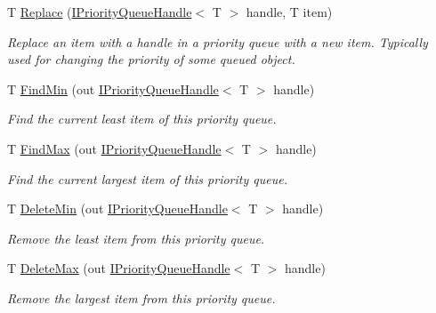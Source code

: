\begin{DoxyCompactItemize}
T \hyperlink{class_c5_1_1_interval_heap_abfc2e592410f83b10f7feb82bcbd53db}{Replace} (\hyperlink{interface_c5_1_1_i_priority_queue_handle}{I\+Priority\+Queue\+Handle}$<$ T $>$ handle, T item)
\begin{DoxyCompactList}\small\item\em Replace an item with a handle in a priority queue with a new item. Typically used for changing the priority of some queued object. \end{DoxyCompactList}\item 
T \hyperlink{class_c5_1_1_interval_heap_a3b14d4af51572b295c9eebdf880ed493}{Find\+Min} (out \hyperlink{interface_c5_1_1_i_priority_queue_handle}{I\+Priority\+Queue\+Handle}$<$ T $>$ handle)
\begin{DoxyCompactList}\small\item\em Find the current least item of this priority queue. \end{DoxyCompactList}\item 
T \hyperlink{class_c5_1_1_interval_heap_aeb97ce7d763c7e3707251de9f76071aa}{Find\+Max} (out \hyperlink{interface_c5_1_1_i_priority_queue_handle}{I\+Priority\+Queue\+Handle}$<$ T $>$ handle)
\begin{DoxyCompactList}\small\item\em Find the current largest item of this priority queue. \end{DoxyCompactList}\item 
T \hyperlink{class_c5_1_1_interval_heap_a3b605362b2ab7bf2268383be00015f6d}{Delete\+Min} (out \hyperlink{interface_c5_1_1_i_priority_queue_handle}{I\+Priority\+Queue\+Handle}$<$ T $>$ handle)
\begin{DoxyCompactList}\small\item\em Remove the least item from this priority queue. \end{DoxyCompactList}\item 
T \hyperlink{class_c5_1_1_interval_heap_ac5446ec37bcee1e0f117fbbe566f6386}{Delete\+Max} (out \hyperlink{interface_c5_1_1_i_priority_queue_handle}{I\+Priority\+Queue\+Handle}$<$ T $>$ handle)
\begin{DoxyCompactList}\small\item\em Remove the largest item from this priority queue. \end{DoxyCompactList}\end{DoxyCompactItemize}
